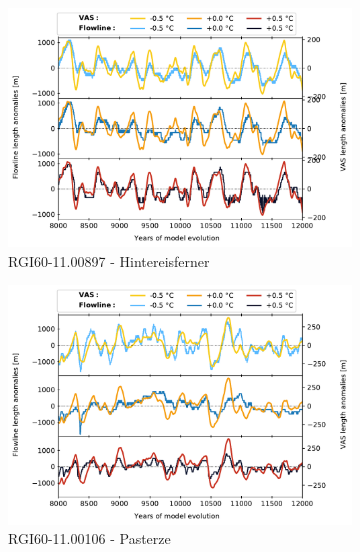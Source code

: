       \begin{figure}[htp]
        \centering
        \begin{subfigure}[b]{0.48\textwidth}
          \caption{RGI60-11.00897 - Hintereisferner}
          \label{fig:random_length:hintereisferner}
          \centering
          \includegraphics[width=\textwidth]{../plots/final_plots/random_length/Hintereisferner.pdf}
        \end{subfigure}
        \hfill
        \begin{subfigure}[b]{0.48\textwidth}
          \caption{RGI60-11.00106 - Pasterze}
          \label{fig:random_length:pasterze}
          \centering
          \includegraphics[width=\textwidth]{../plots/final_plots/random_length/Pasterze.pdf}
        \end{subfigure}
        \begin{subfigure}[b]{0.48\textwidth}

\end{subfigure}
\end{figure}
